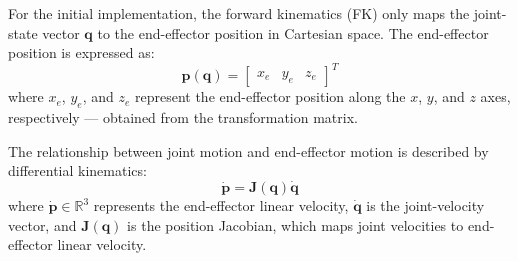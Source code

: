\documentclass[12pt,a4paper]{article}
\begin{document}


For the initial implementation, the forward kinematics (FK) only maps
the joint-state vector $\mathbf{q}$ to the end-effector position
in Cartesian space. The end-effector position is expressed as:
\begin{equation}
    \mathbf{p}(\mathbf{q}) =
    \begin{bmatrix}
        x_e & y_e & z_e
    \end{bmatrix}^{T}
\end{equation}
where $x_e$, $y_e$, and $z_e$ represent the end-effector position
along the $x$, $y$, and $z$ axes, respectively — obtained from the transformation matrix.

The relationship between joint motion and end-effector motion is
described by differential kinematics:
\begin{equation}
    \dot{\mathbf{p}} =
    \mathbf{J}(\mathbf{q})\dot{\mathbf{q}}
\end{equation}
where $\dot{\mathbf{p}} \in \mathbb{R}^{3}$ represents the
end-effector linear velocity, $\dot{\mathbf{q}}$ is the
joint-velocity vector, and $\mathbf{J}(\mathbf{q})$ is the
position Jacobian, which maps joint velocities to end-effector linear velocity. 
\newpage
\end{document}
